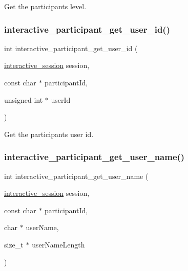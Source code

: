 Get the participant\textquotesingle{}s level. 

\mbox{\label{group___interactivity_ga2bb765e59c4b1a4c4188cff212bb0cff}} 
\subsubsection{\texorpdfstring{interactive\+\_\+participant\+\_\+get\+\_\+user\+\_\+id()}{interactive\_participant\_get\_user\_id()}}
{\footnotesize\ttfamily int interactive\+\_\+participant\+\_\+get\+\_\+user\+\_\+id (\begin{DoxyParamCaption}\item[{\mbox{\hyperlink{group___interactivity_ga6d8819d38b8dc8994a2299cf22a65a31}{interactive\+\_\+session}}}]{session,  }\item[{const char $\ast$}]{participant\+Id,  }\item[{unsigned int $\ast$}]{user\+Id }\end{DoxyParamCaption})}



Get the participant\textquotesingle{}s user id. 

\mbox{\label{group___interactivity_gafd5b3ce5473da2a0d960aaf4463234e8}} 
\subsubsection{\texorpdfstring{interactive\+\_\+participant\+\_\+get\+\_\+user\+\_\+name()}{interactive\_participant\_get\_user\_name()}}
{\footnotesize\ttfamily int interactive\+\_\+participant\+\_\+get\+\_\+user\+\_\+name (\begin{DoxyParamCaption}\item[{\mbox{\hyperlink{group___interactivity_ga6d8819d38b8dc8994a2299cf22a65a31}{interactive\+\_\+session}}}]{session,  }\item[{const char $\ast$}]{participant\+Id,  }\item[{char $\ast$}]{user\+Name,  }\item[{size\+\_\+t $\ast$}]{user\+Name\+Length }\end{DoxyParamCaption})}



